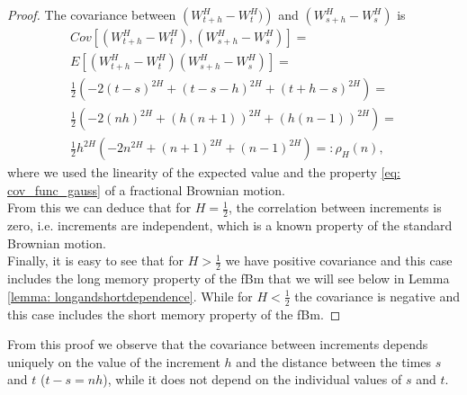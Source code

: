 \documentclass[a4paper,italian,11pt]{book}
\theoremstyle{plain}
\theoremstyle{remark}
\theoremstyle{plain}
\begin{document}
\begin{proof}

The covariance between $ \left( W^H_{t+h}-W^H_t) \right)$ and $\left( W^H_{s+h}-W^H_s \right)$ is
\\

\noindent
\begin{equation}
    \label{eq: correlationW}
    \begin{gathered}
    Cov[\left( W^H_{t+h}-W^H_t \right), \left( W^H_{s+h}-W^H_s \right)] =\\
    E[(W^H_{t+h}-W^H_t)(W^H_{s+h}-W^H_s)] =\\
    \frac{1}{2}\left(-2(t-s)^{2H}+(t-s-h)^{2H} +(t+h-s)^{2H}\right)=\\
    \frac{1}{2}\left(-2(nh)^{2H}+(h(n+1))^{2H}+(h(n-1))^{2H}\right)=\\
    \frac{1}{2}h^{2H}\left(-2n^{2H}+(n+1)^{2H}+(n-1)^{2H}\right) =: \rho_H(n),
    \end{gathered}
\end{equation}
where we used the linearity of the expected value and the property \eqref{eq: cov_func_gauss}
of a fractional Brownian motion. 
\\
From this we can deduce that for $H=\frac{1}{2}$, the correlation between increments is zero, i.e. increments are independent, which is a known property of the standard Brownian motion. \\
Finally, it is easy to see that for $H>\frac{1}{2}$ we have positive covariance and this case includes the long memory property of the fBm that we will see below in Lemma \ref{lemma: longandshortdependence}. While for $H<\frac{1}{2}$ the covariance is negative and this case includes the short memory property of the fBm.

\end{proof}

From this proof we observe that the covariance between increments depends uniquely on the value of the increment $h$ and the distance between the times $s$ and $t$ ($t-s = nh$), while it does not depend on the individual values of $s$ and $t$.
\\
\end{document}
